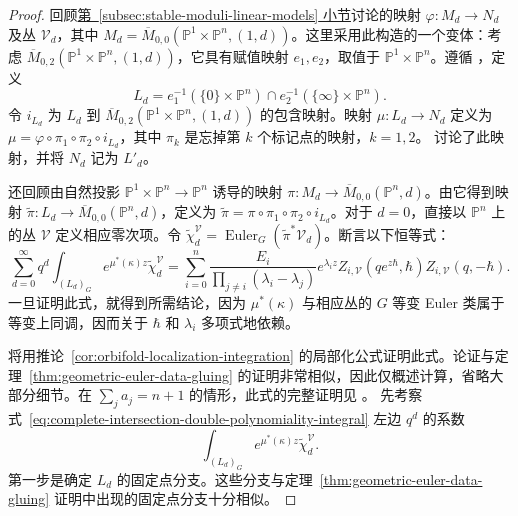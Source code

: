 \begin{proof}
回顾\hyperref[subsec:stable-moduli-linear-models]{第~\ref*{subsec:stable-moduli-linear-models} 小节}讨论的映射 $\varphi:M_d\to N_d$ 及丛 $\mathcal V_d$，其中 $M_d=\overline M_{0,0}(\mathbb P^1\times\mathbb P^n,(1,d))$。这里采用此构造的一个变体：考虑 $\overline M_{0,2}(\mathbb P^1\times\mathbb P^n,(1,d))$，它具有赋值映射 $e_1,e_2$，取值于 $\mathbb P^1\times\mathbb P^n$。遵循 ，定义
\[
L_d=e_1^{-1}(\{0\}\times\mathbb P^n)\cap e_2^{-1}(\{\infty\}\times\mathbb P^n).
\]
令 $i_{L_d}$ 为 $L_d$ 到 $\overline M_{0,2}(\mathbb P^1\times\mathbb P^n,(1,d))$ 的包含映射。映射 $\mu:L_d\to N_d$ 定义为 $\mu=\varphi\circ\pi_1\circ\pi_2\circ i_{L_d}$，其中 $\pi_k$ 是忘掉第 $k$ 个标记点的映射，$k=1,2$。 讨论了此映射，并将 $N_d$ 记为 $L'_d$。

还回顾由自然投影 $\mathbb P^1\times\mathbb P^n\to\mathbb P^n$ 诱导的映射 $\pi:M_d\to\overline M_{0,0}(\mathbb P^n,d)$。由它得到映射 $\widetilde\pi:L_d\to\overline M_{0,0}(\mathbb P^n,d)$，定义为 $\widetilde\pi=\pi\circ\pi_1\circ\pi_2\circ i_{L_d}$。对于 $d=0$，直接以 $\mathbb P^n$ 上的丛 $\mathcal V$ 定义相应零次项。令 $\widetilde\chi_d^{\mathcal V}=\operatorname{Euler}_G(\widetilde\pi^*\mathcal V_d)$。断言以下恒等式：
\begin{equation}\label{eq:complete-intersection-double-polynomiality-integral}
\sum_{d=0}^{\infty}q^d\int_{(L_d)_G}e^{\mu^*(\kappa)z}\widetilde\chi_d^{\mathcal V}
=\sum_{i=0}^n\frac{E_i}{\prod_{j\ne i}(\lambda_i-\lambda_j)}e^{\lambda_i z}
Z_{i,\mathcal V}(qe^{z\hbar},\hbar)Z_{i,\mathcal V}(q,-\hbar).
\end{equation}
一旦证明此式，就得到所需结论，因为 $\mu^*(\kappa)$ 与相应丛的 $G$ 等变 Euler 类属于等变上同调，因而关于 $\hbar$ 和 $\lambda_i$ 多项式地依赖。

将用推论~\ref{cor:orbifold-localization-integration} 的局部化公式证明此式。论证与定理~\ref{thm:geometric-euler-data-gluing} 的证明非常相似，因此仅概述计算，省略大部分细节。在 $\sum_ja_j=n+1$ 的情形，此式的完整证明见 。
先考察式~\eqref{eq:complete-intersection-double-polynomiality-integral} 左边 $q^d$ 的系数
\begin{equation}\label{eq:complete-intersection-double-degree-integral}
\int_{(L_d)_G}e^{\mu^*(\kappa)z}\widetilde\chi_d^{\mathcal V}.
\end{equation}
第一步是确定 $L_d$ 的固定点分支。这些分支与定理~\ref{thm:geometric-euler-data-gluing} 证明中出现的固定点分支十分相似。


\end{proof}
